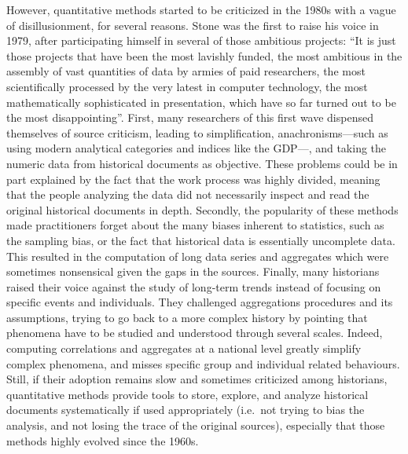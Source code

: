 However, quantitative methods started to be criticized in the 1980s with a vague of disillusionment, for several reasons.
Stone was the first to raise his voice in 1979, after participating himself in several of those ambitious projects: ``It is just those projects that have been the most lavishly funded, the most ambitious in the assembly of vast quantities of data by armies of paid researchers, the most scientifically processed by the very latest in computer technology, the most mathematically sophisticated in presentation, which have so far turned out to be the most disappointing''\cite{stoneRevivalNarrativeReflections1979}.
First, many researchers of this first wave dispensed themselves of source criticism, leading to simplification, anachronisms---such as using modern analytical categories and indices like the GDP---, and taking the numeric data from historical documents as objective.
These problems could be in part explained by the fact that the work process was highly divided, meaning that the people analyzing the data did not necessarily inspect and read the original historical documents in depth.
Secondly, the popularity of these methods made practitioners forget about the many biases inherent to statistics, such as the sampling bias, or the fact that historical data is essentially uncomplete data.
This resulted in the computation of long data series and aggregates which were sometimes nonsensical given the gaps in the sources\cite{lemercierQuantitativeMethodsHumanities2019}.
Finally, many historians raised their voice against the study of long-term trends instead of focusing on specific events and individuals.
They challenged aggregations procedures and its assumptions, trying to go back to a more complex history by pointing that phenomena have to be studied and understood through several scales\cite{trivellatoThereFutureItalian2011}.
Indeed, computing correlations and aggregates at a national level greatly simplify complex phenomena, and misses specific group and individual related behaviours.
Still, if their adoption remains slow and sometimes criticized among historians, quantitative methods provide tools to store, explore, and analyze historical documents systematically if used appropriately (i.e.\ not trying to bias the analysis, and not losing the trace of the original sources), especially that those methods highly evolved since the 1960s.





